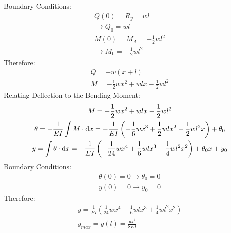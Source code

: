 Boundary Conditions:
\begin{gather}
  Q(0) = R_y = wl \\
  \rightarrow Q_0 = wl \\
  M(0) = M_A = -\frac{1}{2}wl^2 \\
  \rightarrow M_0 = -\frac{1}{2}wl^2
\end{gather}
Therefore:
\begin{gather}
  Q = -w(x+l) \\
  M = -\frac{1}{2}wx^2 + wlx - \frac{1}{2}wl^2
\end{gather}
Relating Deflection to the Bending Moment:
\begin{gather}
  M = -\frac{1}{2}wx^2 + wlx -\frac{1}{2}wl^2 \\
  \theta = -\frac{1}{EI}\int M \cdot \dif x = -\frac{1}{EI} \left(-\frac{1}{6}wx^3 + \frac{1}{2}wlx^2 - \frac{1}{2}wl^2x \right) + \theta_0 \\
  y = \int \theta \cdot \dif x = -\frac{1}{EI} \left(-\frac{1}{24}wx^4 + \frac{1}{6}wlx^3 - \frac{1}{4}wl^2x^2 \right) + \theta_0x + y_0 \\
\end{gather}
Boundary Conditions:
\begin{gather}
  \theta(0) = 0 \rightarrow \theta_0 = 0 \\
  y(0) = 0 \rightarrow y_0 = 0
\end{gather}
Therefore:
\begin{gather}
  y = \frac{1}{EI} \left(\frac{1}{24}wx^4 - \frac{1}{6}wlx^3 + \frac{1}{4}wl^2x^2 \right) \\
  y_{max} = y(l) = \frac{wl^4}{8EI}
\end{gather}